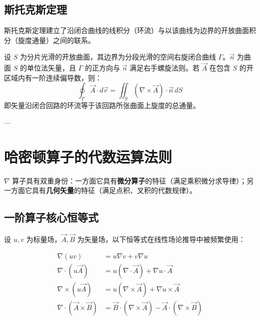 \subsection{斯托克斯定理}
斯托克斯定理建立了沿闭合曲线的线积分（环流）与以该曲线为边界的开放曲面积分（旋度通量）之间的联系。
\begin{tcolorbox}[colback=teal!5!white, colframe=teal!75!black, title=定理 \thechapter.2 \quad 斯托克斯定理 (Stokes's Theorem)]
	设 $S$ 为分片光滑的开放曲面，其边界为分段光滑的空间右旋闭合曲线 $\Gamma$。$\vec{n}$ 为曲面 $S$ 的单位法矢量，且 $\Gamma$ 的正方向与 $\vec{n}$ 满足右手螺旋法则。若 $\vec{A}$ 在包含 $S$ 的开区域内有一阶连续偏导数，则：
	$$ \oint_{\Gamma} \vec{A} \cdot d\vec{r} = \iint_{S} (\nabla \times \vec{A}) \cdot \vec{n}\, dS $$
	即矢量沿闭合回路的环流等于该回路所张曲面上旋度的总通量。
\end{tcolorbox}

---

\section{哈密顿算子的代数运算法则}

$\nabla$ 算子具有双重身份：一方面它具有\textbf{微分算子}的特征（满足乘积微分求导律）；另一方面它具有\textbf{几何矢量}的特征（满足点积、叉积的代数规律）。

\subsection{一阶算子核心恒等式}
设 $u, v$ 为标量场，$\vec{A}, \vec{B}$ 为矢量场，以下恒等式在线性场论推导中被频繁使用：
\begin{tcolorbox}[colback=teal!5!white, colframe=teal!75!black, title=定理 \thechapter.3 \quad 乘积性质恒等式]
	\begin{align}
		\nabla (uv) &= u \nabla v + v \nabla u \\
		\nabla \cdot (u \vec{A}) &= u (\nabla \cdot \vec{A}) + \nabla u \cdot \vec{A} \\
		\nabla \times (u \vec{A}) &= u (\nabla \times \vec{A}) + \nabla u \times \vec{A} \\
		\nabla \cdot (\vec{A} \times \vec{B}) &= \vec{B} \cdot (\nabla \times \vec{A}) - \vec{A} \cdot (\nabla \times \vec{B})
	\end{align}
\end{tcolorbox}


